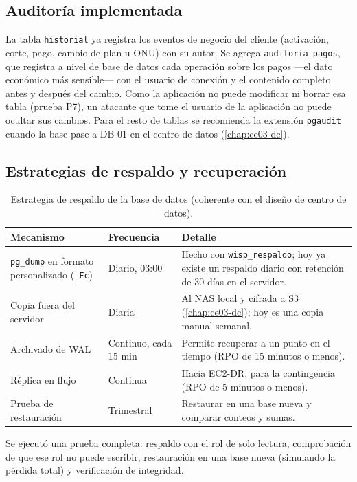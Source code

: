 \subsection{Auditoría implementada}

La tabla \texttt{historial} ya registra los eventos de negocio del cliente (activación,
corte, pago, cambio de plan u ONU) con su autor. Se agrega \texttt{auditoria\_pagos}, que
registra a nivel de base de datos cada operación sobre los pagos ---el dato económico más
sensible--- con el usuario de conexión y el contenido completo antes y después del
cambio. Como la aplicación no puede modificar ni borrar esa tabla (prueba P7), un
atacante que tome el usuario de la aplicación no puede ocultar sus cambios. Para el resto
de tablas se recomienda la extensión \texttt{pgaudit} cuando la base pase a DB-01 en el
centro de datos (\cref{chap:ce03-dc}).

\subsection{Estrategias de respaldo y recuperación}

\begin{table}[H]
\centering
\caption{Estrategia de respaldo de la base de datos (coherente con el diseño de centro de datos).}
\label{tab:ce02-respaldo}
\small
\begin{tabularx}{\textwidth}{L{3.4cm}L{3.2cm}X}
\toprule
\textbf{Mecanismo} & \textbf{Frecuencia} & \textbf{Detalle} \\
\midrule
\texttt{pg\_dump} en formato personalizado (\texttt{-Fc}) & Diario, 03:00 & Hecho con \texttt{wisp\_respaldo}; hoy ya existe un respaldo diario con retención de 30 días en el servidor. \\
Copia fuera del servidor & Diaria & Al NAS local y cifrada a S3 (\cref{chap:ce03-dc}); hoy es una copia manual semanal. \\
Archivado de WAL & Continuo, cada 15 min & Permite recuperar a un punto en el tiempo (RPO de 15 minutos o menos). \\
Réplica en flujo & Continua & Hacia EC2-DR, para la contingencia (RPO de 5 minutos o menos). \\
Prueba de restauración & Trimestral & Restaurar en una base nueva y comparar conteos y sumas. \\
\bottomrule
\end{tabularx}
\end{table}

Se ejecutó una prueba completa: respaldo con el rol de solo lectura, comprobación de que
ese rol no puede escribir, restauración en una base nueva (simulando la pérdida total) y
verificación de integridad.

